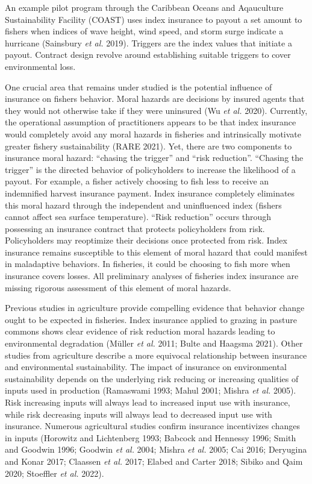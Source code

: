 \documentclass[
  letterpaper,
  DIV=11,
  numbers=noendperiod]{scrartcl}
\theoremstyle{plain}
\theoremstyle{plain}
\theoremstyle{remark}
\begin{document}
An example pilot program through the Caribbean Oceans and Aqauculture
Sustainability Facility (COAST) uses index insurance to payout a set
amount to fishers when indices of wave height, wind speed, and storm
surge indicate a hurricane (Sainsbury \emph{et al.} 2019). Triggers are
the index values that initiate a payout. Contract design revolve around
establishing suitable triggers to cover environmental loss.

One crucial area that remains under studied is the potential influence
of insurance on fishers behavior. Moral hazards are decisions by insured
agents that they would not otherwise take if they were uninsured (Wu
\emph{et al.} 2020). Currently, the operational assumption of
practitioners appears to be that index insurance would completely avoid
any moral hazards in fisheries and intrinsically motivate greater
fishery sustainability (RARE 2021). Yet, there are two components to
insurance moral hazard: ``chasing the trigger'' and ``risk reduction''.
``Chasing the trigger'' is the directed behavior of policyholders to
increase the likelihood of a payout. For example, a fisher actively
choosing to fish less to receive an indemnified harvest insurance
payment. Index insurance completely eliminates this moral hazard through
the independent and uninfluenced index (fishers cannot affect sea
surface temperature). ``Risk reduction'' occurs through possessing an
insurance contract that protects policyholders from risk. Policyholders
may reoptimize their decisions once protected from risk. Index insurance
remains susceptible to this element of moral hazard that could manifest
in maladaptive behaviors. In fisheries, it could be choosing to fish
more when insurance covers losses. All preliminary analyses of fisheries
index insurance are missing rigorous assessment of this element of moral
hazards.

Previous studies in agriculture provide compelling evidence that
behavior change ought to be expected in fisheries. Index insurance
applied to grazing in pasture commons shows clear evidence of risk
reduction moral hazards leading to environmental degradation (Müller
\emph{et al.} 2011; Bulte and Haagsma 2021). Other studies from
agriculture describe a more equivocal relationship between insurance and
environmental sustainability. The impact of insurance on environmental
sustainability depends on the underlying risk reducing or increasing
qualities of inputs used in production (Ramaswami 1993; Mahul 2001;
Mishra \emph{et al.} 2005). Risk increasing inputs will always lead to
increased input use with insurance, while risk decreasing inputs will
always lead to decreased input use with insurance. Numerous agricultural
studies confirm insurance incentivizes changes in inputs (Horowitz and
Lichtenberg 1993; Babcock and Hennessy 1996; Smith and Goodwin 1996;
Goodwin \emph{et al.} 2004; Mishra \emph{et al.} 2005; Cai 2016;
Deryugina and Konar 2017; Claassen \emph{et al.} 2017; Elabed and Carter
2018; Sibiko and Qaim 2020; Stoeffler \emph{et al.} 2022).
\end{document}

